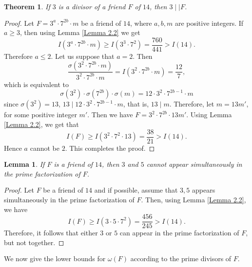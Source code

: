 \documentclass[11pt,twoside]{amsart}
\newtheorem{theorem}{Theorem}[section]
\newtheorem{lemma}{Lemma}[section]
\begin{document}
\begin{theorem}
If $3$ is a divisor of a friend $F$ of $14$, then $3\mid\mid F$.
\end{theorem}

\begin{proof}
Let $F=3^{a}\cdot7^{2b}\cdot m$ be a friend of $14$, where $a,b,m$ are positive integers. If $a\geq3$, then using Lemma \ref{Lemma 2.2} we get
$$I(3^{a}\cdot7^{2b}\cdot m)\geq I(3^3\cdot 7^2)=\frac{760}{441}>I(14).$$
Therefore $a\leq2$. Let us suppose that $a=2$. Then
$$\frac{\sigma(3^2\cdot7^{2b}\cdot m)}{3^2\cdot7^{2b}\cdot m}=I(3^2\cdot7^{2b}\cdot m)=\frac{12}{7},$$
which is equivalent to
$$\sigma(3^2)\cdot \sigma(7^{2b})\cdot \sigma(m)=12\cdot3^2\cdot 7^{2b-1}\cdot m $$
since $\sigma(3^2)=13$, $13\mid 12\cdot3^2\cdot 7^{2b-1}\cdot m$, that is, $13\mid m$. Therefore, let $m=13m'$, for some positive integer $m'$. Then we have $F=3^2\cdot7^{2b}\cdot 13m'$. Using Lemma \ref{Lemma 2.2}, we get that
$$I(F)\geq I(3^2\cdot 7^2\cdot 13)=\frac{38}{21}>I(14).$$
Hence $a$ cannot be $2$. This completes the proof.
\end{proof}

\begin{lemma}\label{lemma 3.8}
If $F$ is a friend of $14$, then $3$ and $5$ cannot appear simultaneously in the prime factorization of $F$.
\end{lemma}

\begin{proof}
Let $F$ be a friend of $14$ and if possible, assume that $3,5$ appears simultaneously in the prime factorization of $F$. Then, using Lemma \ref{Lemma 2.2}, we have
$$I(F)\geq I(3\cdot5\cdot 7^2)=\frac{456}{245}>I(14).$$
Therefore, it follows that either $3$ or $5$ can appear in the prime factorization of $F$, but not \linebreak together.
\end{proof}

\smallskip

We now give the lower bounds for $\omega(F)$ according to the prime divisors of $F$.

\smallskip
\end{document}
